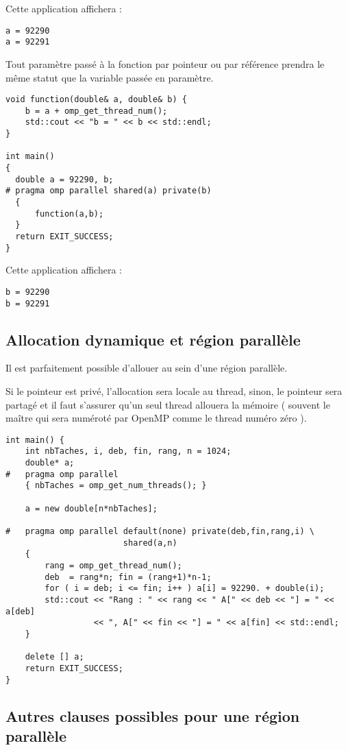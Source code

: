 \documentclass[fleqn,11pt]{article}
\begin{document}
Cette application affichera :
\begin{verbatim}
a = 92290
a = 92291
\end{verbatim}

Tout paramètre passé à la fonction par pointeur ou par référence prendra le même statut que la variable passée en paramètre.

\begin{lstlisting}
void function(double& a, double& b) {
    b = a + omp_get_thread_num();
    std::cout << "b = " << b << std::endl;
}

int main()
{
  double a = 92290, b;
# pragma omp parallel shared(a) private(b)
  {
      function(a,b);
  }
  return EXIT_SUCCESS;
}
\end{lstlisting}

Cette application affichera :
\begin{verbatim}
b = 92290
b = 92291
\end{verbatim}

\subsection{Allocation dynamique et région parallèle}

Il est parfaitement possible d'allouer au sein d'une région parallèle.

Si le pointeur est privé, l'allocation sera locale au thread, sinon, le pointeur sera partagé et il faut s'assurer qu'un seul thread allouera la mémoire ( souvent le maître qui sera numéroté par OpenMP comme le thread numéro zéro ).

\begin{lstlisting}
int main() {
    int nbTaches, i, deb, fin, rang, n = 1024;
    double* a;
#   pragma omp parallel
    { nbTaches = omp_get_num_threads(); }

    a = new double[n*nbTaches];
    
#   pragma omp parallel default(none) private(deb,fin,rang,i) \
                        shared(a,n)
    {
        rang = omp_get_thread_num();
        deb  = rang*n; fin = (rang+1)*n-1;
        for ( i = deb; i <= fin; i++ ) a[i] = 92290. + double(i);
        std::cout << "Rang : " << rang << " A[" << deb << "] = " << a[deb]
                  << ", A[" << fin << "] = " << a[fin] << std::endl;
    }
    
    delete [] a;
    return EXIT_SUCCESS;
}
\end{lstlisting}

\subsection{Autres clauses possibles pour une région parallèle}
\end{document}
